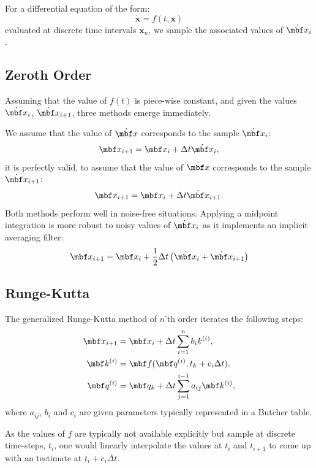 \documentclass[10pt,a4paper]{article}
\numberwithin{equation}{section}
\begin{document}
For a differential equation of the form:
\begin{equation}
\dot{\textbf{x}} = f(t, \textbf{x})
\end{equation}
evaluated at discrete time intervals $\textbf{x}_n$, we sample the associated values of $\dot{\mbf x}_i$.

\subsection{Zeroth Order}
Assuming that the value of $f(t)$ is piece-wise constant, and given the values $\dot{\mbf x}_i$, $\dot{\mbf x}_{i+1}$, three methods emerge immediately.

We assume that the value of $\dot{\mbf x}$ corresponds to the sample $\dot{\mbf x}_i$:
\[
\mbf x_{i+1} = \mbf x_{i} + \Delta t \dot{\mbf x}_i,
\label{eq:first_order_forward}
\]
it is perfectly valid, to assume that the value of $\dot{\mbf x}$ corresponds to the sample $\dot{\mbf x}_{i+1}$:
\[
\mbf x_{i+1} = \mbf x_{i} + \Delta t \dot{\mbf x}_{i+1}.
\label{eq:first_order_backward}
\]
Both methods perform well in noise-free situations. Applying a midpoint integration is more robust to noisy values of $\dot{\mbf x}_i$ as it implements an implicit averaging filter:
\[
\mbf x_{i+1} = \mbf x_{i} + \dfrac{1}{2}\Delta t \left( \dot{\mbf x}_{i} + \dot{\mbf x}_{i+1} \right)
\label{eq:first_order_midward}
\]

\subsection{Runge-Kutta}
\label{sec:runge-kutta}
The generalized Runge-Kutta method of $n$'th order iterates the following steps:
\begin{align}
\mbf x_{i+1} & = \mbf x_{i} + \Delta t \sum_{i = 1}^{n} b_i k^{(i)}, \\ 
\mbf k^{(i)} & = \mbf f(\mbf q^{(i)}, t_k + c_i \Delta t), \\
\mbf q^{(i)} & = \mbf q_k + \Delta t \sum_{j = 1}^{i - 1}a_{ij}\mbf k^{(i)},
\end{align}
where $a_{ij}$, $b_i$ and $c_i$ are given parameters typically represented in a Butcher table.

As the values of $f$ are typically not available explicitly but sample at discrete time-steps, $t_i$, one would linearly interpolate
the values at $t_i$ and $t_{i+1}$ to come up with an testimate at $t_i + c_i \Delta t$.
\end{document}
